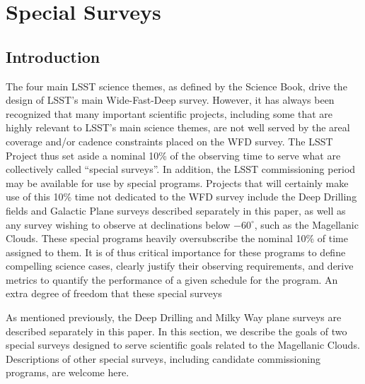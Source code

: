 \chapter[Special Surveys]{Special Surveys}
\def\chpname{specialsurveys}\label{chp:\chpname}





\section{Introduction}
\label{sec:specials:intro}


The four main LSST science themes, as defined by the Science Book, drive the design of LSST's main Wide-Fast-Deep survey.  However, it has always been recognized that many important scientific projects, including some that are highly relevant to LSST's main science themes, are not well served by the areal coverage and/or cadence constraints placed on the WFD survey.  The LSST Project thus set aside a nominal 10\% of the observing time to serve what are collectively called ``special surveys''.  In addition, the LSST commissioning period may be available for use by special programs.  Projects that will certainly make use of this 10\% time not dedicated to the WFD survey include the Deep Drilling fields and Galactic Plane surveys described separately in this paper, as well as any survey wishing to observe at declinations below $-60^\circ$, such as the Magellanic Clouds.  These special programs heavily oversubscribe the nominal 10\% of time assigned to them.  It is of thus critical importance for these programs to define compelling science cases, clearly justify their observing requirements, and derive metrics to quantify the performance of a given schedule for the program.  An extra degree of freedom that these special surveys 


As mentioned previously, the Deep Drilling and Milky Way plane surveys are described separately in this paper.  In this section, we describe the goals of two special surveys designed to serve scientific goals related to the Magellanic Clouds.  Descriptions of other special surveys, including candidate commissioning programs, are welcome here.


